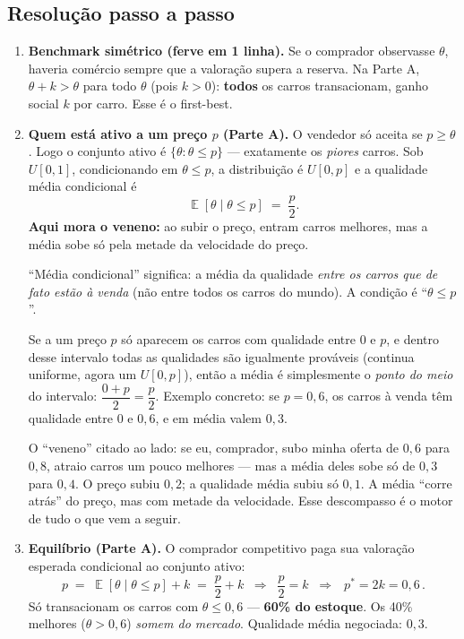 \documentclass[11pt,a4paper]{article}
\DeclareMathOperator{\Esp}{\mathbb{E}}
\newcommand{\dc}[2]{#1{,}#2}
\begin{document}
\subsection*{Resolução passo a passo}
\begin{enumerate}[leftmargin=2em,itemsep=4pt]

\item \textbf{Benchmark simétrico (ferve em 1 linha).} Se o comprador observasse
$\theta$, haveria comércio sempre que a valoração supera a reserva. Na Parte A,
$\theta + k > \theta$ para todo $\theta$ (pois $k>0$): \textbf{todos} os carros
transacionam, ganho social $k$ por carro. Esse é o first-best.

\item \textbf{Quem está ativo a um preço $p$ (Parte A).} O vendedor só aceita se
$p \ge \theta$. Logo o conjunto ativo é $\{\theta : \theta \le p\}$ — exatamente os
\emph{piores} carros. Sob $U[0,1]$, condicionando em $\theta \le p$, a distribuição é
$U[0,p]$ e a qualidade média condicional é
\[
\Esp[\theta \mid \theta \le p] \;=\; \frac{p}{2}. \tag{1.1}
\]
\textbf{Aqui mora o veneno:} ao subir o preço, entram carros melhores, mas a média sobe
só pela metade da velocidade do preço.

\begin{empalavras}
``Média condicional'' significa: a média da qualidade \emph{entre os carros que de fato
estão à venda} (não entre todos os carros do mundo). A condição é ``$\theta \le p$''.

\smallskip\noindent
Se a um preço $p$ só aparecem os carros com qualidade entre $0$ e $p$, e dentro desse
intervalo todas as qualidades são igualmente prováveis (continua uniforme, agora um
$U[0,p]$), então a média é simplesmente o \emph{ponto do meio} do intervalo: $\dfrac{0+p}{2}
= \dfrac{p}{2}$. Exemplo concreto: se $p = \dc{0}{6}$, os carros à venda têm qualidade
entre $0$ e $\dc{0}{6}$, e em média valem $\dc{0}{3}$.

\smallskip\noindent
O ``veneno'' citado ao lado: se eu, comprador, subo minha oferta de $\dc{0}{6}$ para
$\dc{0}{8}$, atraio carros um pouco melhores — mas a média deles sobe só de $\dc{0}{3}$
para $\dc{0}{4}$. O preço subiu $\dc{0}{2}$; a qualidade média subiu só $\dc{0}{1}$.
A média ``corre atrás'' do preço, mas com metade da velocidade. Esse descompasso é o
motor de tudo o que vem a seguir.
\end{empalavras}

\item \textbf{Equilíbrio (Parte A).} O comprador competitivo paga sua valoração esperada
condicional ao conjunto ativo:
\[
p \;=\; \Esp[\theta \mid \theta \le p] + k \;=\; \frac{p}{2} + k
\;\;\Longrightarrow\;\; \frac{p}{2} = k
\;\;\Longrightarrow\;\; \boxed{\,p^\ast = 2k = \dc{0}{6}\,}. \tag{1.2}
\]
Só transacionam os carros com $\theta \le \dc{0}{6}$ — \textbf{60\% do estoque}. Os 40\%
melhores ($\theta > \dc{0}{6}$) \emph{somem do mercado}. Qualidade média negociada:
$\dc{0}{3}$.


\end{enumerate}
\end{document}
